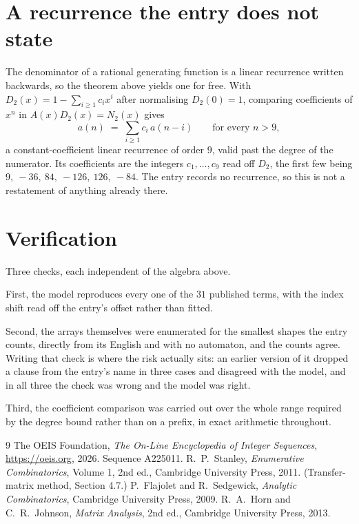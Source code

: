 \documentclass[11pt,a4paper]{article}
\theoremstyle{plain}
\theoremstyle{definition}
\begin{document}
\section{A recurrence the entry does not state}

The denominator of a rational generating function is a linear recurrence written backwards, so
the theorem above yields one for free. With $D_2(x)=1-\sum_{i\ge1}c_ix^i$ after normalising
$D_2(0)=1$, comparing coefficients of $x^n$ in $A(x)D_2(x)=N_2(x)$ gives
\[
a(n)\;=\;\sum_{i\ge1}c_i\,a(n-i)\qquad\text{for every }n>9,
\]
a constant-coefficient linear recurrence of order $9$, valid past the degree of the
numerator. Its coefficients are the integers $c_1,\dots,c_{9}$ read off $D_2$, the first few being $9,\ -36,\ 84,\ -126,\ 126,\ -84$. The entry records no recurrence, so this is not a restatement of anything
already there.

\section{Verification}

Three checks, each independent of the algebra above.

First, the model reproduces every one of the $31$ published terms, with the index shift
read off the entry's offset rather than fitted.

Second, the arrays themselves were enumerated for the smallest shapes the entry counts,
directly from its English and with no automaton, and the counts agree. Writing that check is
where the risk actually sits: an earlier version of it dropped a clause from the entry's name
in three cases and disagreed with the model, and in all three the check was wrong and the model
was right.

Third, the coefficient comparison was carried out over the whole range required by the degree
bound rather than on a prefix, in exact arithmetic throughout.

\begin{thebibliography}{9}
 The OEIS Foundation, \emph{The On-Line Encyclopedia of Integer
Sequences}, \url{https://oeis.org}, 2026. Sequence A225011.
 R.~P.~Stanley, \emph{Enumerative Combinatorics}, Volume 1, 2nd ed.,
Cambridge University Press, 2011. (Transfer-matrix method, Section 4.7.)
 P.~Flajolet and R.~Sedgewick, \emph{Analytic Combinatorics}, Cambridge
University Press, 2009.
 R.~A.~Horn and C.~R.~Johnson, \emph{Matrix Analysis}, 2nd ed., Cambridge
University Press, 2013.
\end{thebibliography}
\end{document}
